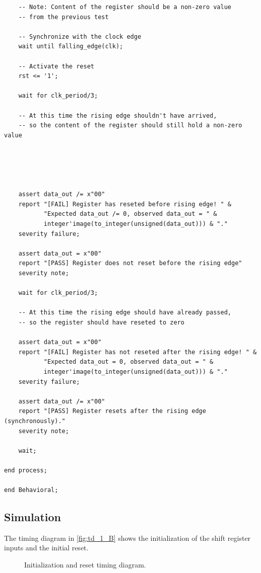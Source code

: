 \documentclass[10pt]{article}
\begin{document}
\begin{verbatim}
    -- Note: Content of the register should be a non-zero value
    -- from the previous test
    
    -- Synchronize with the clock edge
    wait until falling_edge(clk);
    
    -- Activate the reset
    rst <= '1';
    
    wait for clk_period/3;
        
    -- At this time the rising edge shouldn't have arrived, 
    -- so the content of the register should still hold a non-zero value
    
    
    
    
    
    assert data_out /= x"00"
    report "[FAIL] Register has reseted before rising edge! " &
           "Expected data_out /= 0, observed data_out = " & 
           integer'image(to_integer(unsigned(data_out))) & "."
    severity failure;
    
    assert data_out = x"00"
    report "[PASS] Register does not reset before the rising edge"
    severity note;
    
    wait for clk_period/3;
            
    -- At this time the rising edge should have already passed,
    -- so the register should have reseted to zero
    
    assert data_out = x"00"
    report "[FAIL] Register has not reseted after the rising edge! " &
           "Expected data_out = 0, observed data_out = " & 
           integer'image(to_integer(unsigned(data_out))) & "."
    severity failure;
    
    assert data_out /= x"00"
    report "[PASS] Register resets after the rising edge (synchronously)."
    severity note;
    
    wait;
    
end process;

end Behavioral;

\end{verbatim}
\newpage


\subsection{Simulation}

The timing diagram in \autoref{fig:td_1_B} shows the initialization of the shift register inputs and the initial reset. 
\begin{figure}[h!t]
    \centering
    \caption{Initialization and reset timing diagram.}
    \label{fig:td_1_B}
\end{figure}
\end{document}
